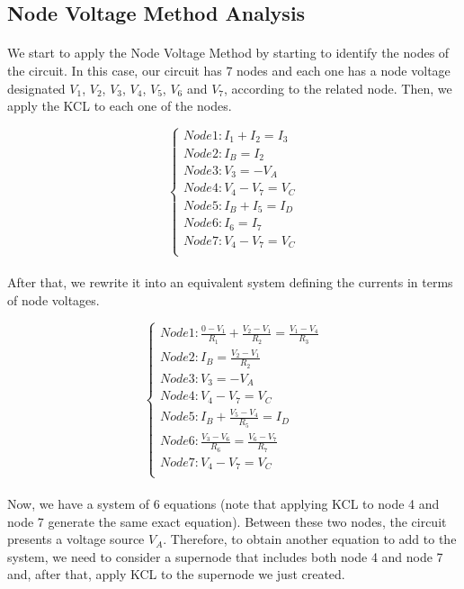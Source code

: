 


\subsection{Node Voltage Method Analysis}
\label{subsec:node}

\paragraph{}
We start to apply the Node Voltage Method by starting to identify the nodes of the circuit. In this case, our circuit has 7 nodes and each one has a node voltage designated $V_1$, $V_2$, $V_3$, $V_4$, $V_5$, $V_6$ and $V_7$, according to the related node. Then, we apply the KCL to each one of the nodes.

\[
\left\{\begin{matrix}
Node 1: I_1 + I_2 = I_3\\
Node 2: I_B=I_2\\
Node 3: V_3=-V_A\\
Node 4: V_4 - V_7 = V_C\\
Node 5: I_B + I_5 = I_D\\
Node 6: I_6 = I_7\\
Node 7: V_4 - V_7 = V_C\\
\end{matrix}\right.
\]

\paragraph{}
After that, we rewrite it into an equivalent system defining the currents in terms of node voltages.

\[
\left\{\begin{matrix}
Node 1: \frac{0-V_1}{R_1}+\frac{V_2-V_1}{R_2}=\frac{V_1-V_4}{R_3}\\
Node 2: I_B=\frac{V_2-V_1}{R_2}\\
Node 3: V_3=-V_A\\
Node 4: V_4 - V_7 = V_C\\
Node 5: I_B+\frac{V_5-V_4}{R_5}=I_D\\
Node 6: \frac{V_3-V_6}{R_6}=\frac{V_6-V_7}{R_7}\\
Node 7: V_4 - V_7 = V_C\\
\end{matrix}\right.
\]

\paragraph{}
Now, we have a system of 6 equations (note that applying KCL to node 4 and node 7 generate the same exact equation). Between these two nodes, the circuit presents a voltage source $V_A$. Therefore, to obtain another equation to add to the system, we need to consider a supernode that includes both node 4 and node 7 and, after that, apply KCL to the supernode we just created.

